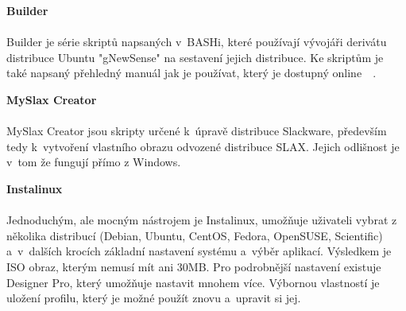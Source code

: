 \documentclass[a4paper,12pt]{article}
\newcommand{\nadpis}[1]{%
	\vspace{4 mm}
	\textbf{#1}\\
	\vspace{4 mm}
	}
\begin{document}

\nadpis{Builder}\\
Builder je série skriptů napsaných v~BASHi, které používají vývojáři derivátu distribuce Ubuntu "gNewSense" na sestavení jejich distribuce. Ke skriptům je také napsaný přehledný manuál jak je používat, který je dostupný online~\cite{Linux_Build}~\cite{BuilderNavod}.


\nadpis{MySlax Creator}\\
MySlax Creator jsou skripty určené k~úpravě distribuce Slackware, především tedy k~vytvoření vlastního obrazu odvozené distribuce SLAX. Jejich odlišnost je v~tom že fungují přímo z Windows.


\newpage
\nadpis{Instalinux}\\ \label{sec:Instalinux}
Jednoduchým, ale mocným nástrojem je Instalinux, umožňuje uživateli vybrat z několika distribucí (Debian, Ubuntu, CentOS, Fedora, OpenSUSE, Scientific) a~v~dalších krocích základní nastavení systému a~výběr aplikací. Výsledkem je ISO obraz, kterým nemusí mít ani 30MB. Pro podrobnější nastavení existuje Designer Pro, který umožňuje nastavit mnohem více. Výbornou vlastností je uložení profilu, který je možné použít znovu a~upravit si jej.\\

\end{document}
